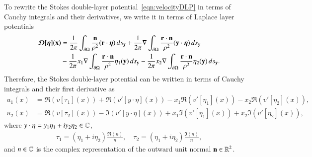 \documentclass[preprint, 10pt]{elsarticle}
\begin{document}
To rewrite the Stokes double-layer potential~\eqref{eqn:velocityDLP} in
terms of Cauchy integrals and their derivatives, we write it in terms of
Laplace layer potentials
\begin{equation}
  \label{eqn:Stokes2Laplace}
  \begin{aligned}
    {\boldsymbol{\mathcal D}}[{\boldsymbol\eta}]({\mathbf{x}}) &= 
      \frac{1}{2\pi} \int_{{\partial}\Omega} 
        \frac{{\mathbf{n}}}{\rho^2} ({\mathbf{r}} \cdot {\boldsymbol\eta}) \, ds_{\mathbf{y}} + 
      \frac{1}{2\pi} \nabla \int_{{\partial}\Omega}
        \frac{{\mathbf{r}} \cdot {\mathbf{n}}}{\rho^2} ({\mathbf{y}} \cdot {\boldsymbol\eta}) \, ds_{\mathbf{y}} \\
      &- \frac{1}{2\pi} x_1 \nabla \int_{{\partial}\Omega}
        \frac{{\mathbf{r}} \cdot {\mathbf{n}}}{\rho^2}\eta_1({\mathbf{y}}) \, ds_{\mathbf{y}} -
      \frac{1}{2\pi} x_2 \nabla \int_{{\partial}\Omega}
        \frac{{\mathbf{r}} \cdot {\mathbf{n}}}{\rho^2}\eta_2({\mathbf{y}}) \, ds_{\mathbf{y}}.
  \end{aligned}
\end{equation}
Therefore, the Stokes double-layer potential can be written in terms of
Cauchy integrals and their first derivative  as~\cite{bar-wu-vee2015}
\begin{equation}
  \begin{aligned}
    u_1(x) &= \Re (v[\tau_1](x)) + \Re (v'[y\cdot\eta](x)) 
             -x_1\Re (v'[\eta_1](x)) - x_2\Re (v'[\eta_2](x)), \\
    u_2(x) &= \Re (v[\tau_2](x)) - \Im (v'[y\cdot\eta](x)) 
         +x_1\Im (v'[\eta_1](x)) + x_2\Im (v'[\eta_2](x)),
  \end{aligned}
  \label{eqn:cauchyVelocity}
\end{equation}
where $y \cdot \eta = y_1 \eta_1 + i y_2 \eta_2 \in {\mathbb{C}}$, 
\begin{align} 
  \tau_1=(\eta_1+i\eta_2)\frac{\Re(n)}{n}, \quad
  \tau_2=(\eta_1+i\eta_2)\frac{\Im(n)}{n},
\end{align}
and $n \in {\mathbb{C}}$ is the complex representation of the outward unit normal
${\mathbf{n}} \in {\mathbb{R}}^2$.


\end{document}
